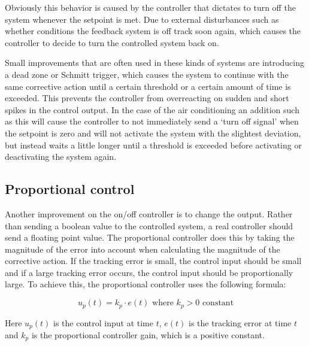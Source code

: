 Obviously this behavior is caused by the controller that dictates to turn off the system whenever the setpoint is met. Due to external disturbances such as whether conditions the feedback system is off track soon again, which causes the controller to decide to turn the controlled system back on.

Small improvements that are often used in these kinds of systems are introducing a dead zone or Schmitt trigger, which causes the system to continue with the same corrective action until a certain threshold or a certain amount of time is exceeded. This prevents the controller from overreacting on sudden and short spikes in the control output. In the case of the air conditioning an addition such as this will cause the controller to not immediately send a `turn off signal' when the setpoint is zero and will not activate the system with the slightest deviation, but instead waits a little longer until a threshold is exceeded before activating or deactivating the system again.

\subsection{Proportional control}
Another improvement on the on/off controller is to change the output. Rather than sending a boolean value to the controlled system, a real controller should send a floating point value. The proportional controller does this by taking the magnitude of the error into account when calculating the magnitude of the corrective action. If the tracking error is small, the control input should be small and if a large tracking error occurs, the control input should be proportionally large. To achieve this, the proportional controller uses the following formula:

\begin{equation} \label{eq:proportional-control}
u_p(t) = k_p \cdot e(t) \text{\ \ \ \ where } k_p > 0 \text{ constant}
\end{equation} 

Here $u_p(t)$ is the control input at time $t$, $e(t)$ is the tracking error at time $t$ and $k_p$ is the proportional controller gain, which is a positive constant.